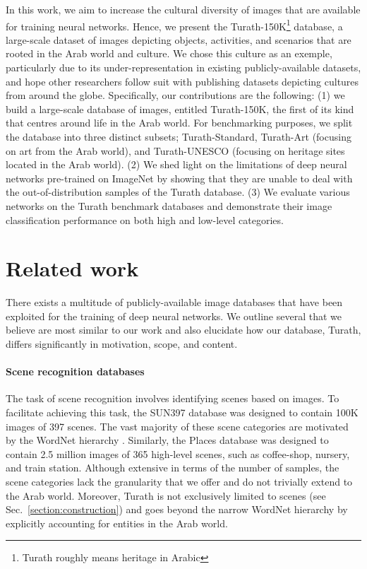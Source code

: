 \documentclass{article}
\begin{document}
In this work, we aim to increase the cultural diversity of images that are available for training neural networks. Hence, we present the Turath-150K\footnote{Turath roughly means heritage in Arabic} database, a large-scale dataset of images depicting objects, activities, and scenarios that are rooted in the Arab world and culture. We chose this culture as an exemple, particularly due to its under-representation in existing publicly-available datasets, and hope other researchers follow suit with publishing datasets depicting cultures from around the globe. Specifically, our contributions are the following: (1) we build a large-scale database of images, entitled Turath-150K, the first of its kind that centres around life in the Arab world. For benchmarking purposes, we split the database into three distinct subsets; Turath-Standard, Turath-Art (focusing on art from the Arab world), and Turath-UNESCO (focusing on heritage sites located in the Arab world). (2) We shed light on the limitations of deep neural networks pre-trained on ImageNet by showing that they are unable to deal with the out-of-distribution samples of the Turath database. (3) We evaluate various networks on the Turath benchmark databases and demonstrate their image classification performance on both high and low-level categories. 

\section{Related work}

There exists a multitude of publicly-available image databases that have been exploited for the training of deep neural networks. We outline several that we believe are most similar to our work and also elucidate how our database, Turath, differs significantly in motivation, scope, and content. 

\paragraph{Scene recognition databases}
The task of scene recognition involves identifying scenes based on images. To facilitate achieving this task, the SUN397 database \cite{xiao2010sun} was designed to contain 100K images of 397 scenes. The vast majority of these scene categories are motivated by the WordNet hierarchy \cite{Fellbaum2010}. Similarly, the Places database \cite{zhou2017places} was designed to contain 2.5 million images of 365 high-level scenes, such as coffee-shop, nursery, and train station. Although extensive in terms of the number of samples, the scene categories lack the granularity that we offer and do not trivially extend to the Arab world. Moreover, Turath is not exclusively limited to scenes (see Sec.~\ref{section:construction}) and goes beyond the narrow WordNet hierarchy by explicitly accounting for entities in the Arab world.
\end{document}
